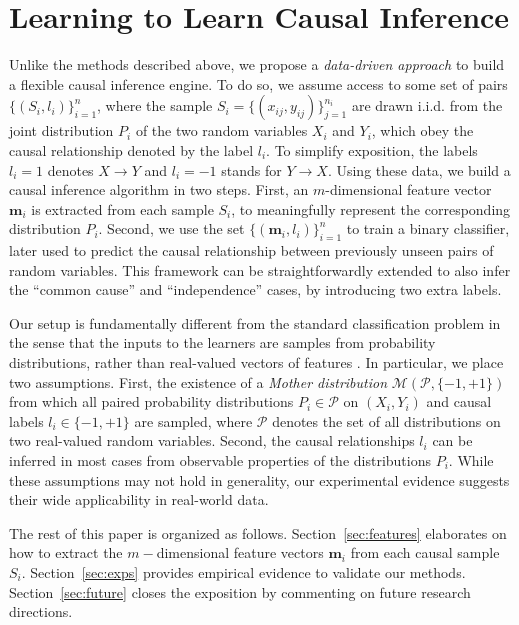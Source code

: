 \documentclass[twoside,11pt,a4paper]{article}
\begin{document}
\section{Learning to Learn Causal Inference} 

Unlike the methods described above, we propose a \emph{data-driven approach} to
build a flexible causal inference engine.  To do so, we assume access to some
set of pairs $\{(S_i,l_i)\}_{i=1}^n$, where the sample $S_i
=\{(x_{ij},y_{ij})\}_{j=1}^{n_i}$ are drawn i.i.d. from the joint distribution
$P_i$ of the two random variables $X_i$ and $Y_i$, which obey the causal
relationship denoted by the label $l_i$.  To simplify exposition, the labels
$l_i = 1$ denotes $X \rightarrow Y$ and $l_i = -1$ stands for $Y \rightarrow
X$.  Using these data, we build a causal inference algorithm in two steps.
First, an $m$-dimensional feature vector $\mathbf{m}_i$ is extracted from each
sample $S_i$, to meaningfully represent the corresponding distribution $P_i$.
Second, we use the set $\{(\mathbf{m}_i, l_i)\}_{i=1}^{n}$ to train a binary
classifier, later used to predict the causal relationship between previously
unseen pairs of random variables.  This framework can be straightforwardly
extended to also infer the ``common cause'' and ``independence'' cases, by
introducing two extra labels. 

Our setup is fundamentally different from the standard classification problem
in the sense that the inputs to the learners are samples from probability
distributions, rather than real-valued vectors of features
\citep{Muandet12,Szabo14}.  In particular, we place two assumptions.
First, the existence of a \emph{Mother distribution}
$\mathcal{M}(\mathcal{P},\{-1,+1\})$ from which all paired probability
distributions $P_i \in \mathcal{P}$ on $(X_i,Y_i)$ and causal labels $l_i \in
\{-1,+1\}$ are sampled, where $\mathcal{P}$ denotes the set of all distributions on
two real-valued random variables. Second, the causal relationships $l_i$ can be
inferred in most cases from observable properties of the distributions $P_i$.
While these assumptions may not hold in generality, our experimental evidence
suggests their wide applicability in real-world data.

The rest of this paper is organized as follows.  Section~\ref{sec:features}
elaborates on how to extract the $m-$dimensional feature vectors $\mathbf{m}_i$ from
each causal sample $S_i$.  Section~\ref{sec:exps} provides empirical evidence
to validate our methods. Section~\ref{sec:future} closes the
exposition by commenting on future research directions. 
\end{document}
